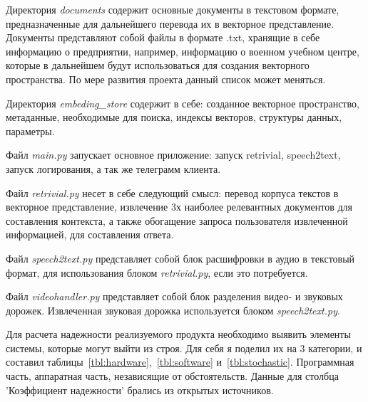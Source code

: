 Директория \emph{documents} содержит основные документы в текстовом формате,
предназначенные для дальнейшего перевода их в векторное представление.
Документы представляют собой файлы в формате .txt, хранящие в себе информацию
о предприятии, например, информацию о военном учебном центре, которые в
дальнейшем будут использоваться для создания векторного пространства.
По мере развития проекта данный список может меняться.

Директория \emph{embeding\_store} содержит в себе: созданное векторное 
пространство, метаданные, необходимые для поиска, индексы векторов, структуры
данных, параметры.

Файл \emph{main.py} запускает основное приложение: запуск retrivial, speech2text,
запуск логирования, а так же телеграмм клиента.

Файл \emph{retrivial.py} несет в себе следующий смысл: перевод корпуса текстов
в векторное представление, извлечение 3х наиболее релевантных документов для
составления контекста, а также обогащение запроса пользователя извлеченной
информацией, для составления ответа.

Файл \emph{speech2text.py} представляет собой блок расшифровки в аудио
в текстовый формат, для использования блоком \emph{retrivial.py}, если
это потребуется.

Файл \emph{videohandler.py} представляет собой блок разделения видео- и
звуковых дорожек. Извлеченная звуковая дорожка используется блоком
\emph{speech2text.py}.



Для расчета надежности реализуемого продукта необходимо выявить элементы
системы, которые могут выйти из строя. Для себя я поделил их на 3 категории, и
составил таблицы~\ref{tbl:hardware},~\ref{tbl:software} и~\ref{tbl:stochastic}.
Программная часть, аппаратная часть, независящие от обстоятельств. Данные для
столбца 'Коэффициент надежности' брались из открытых источников.

